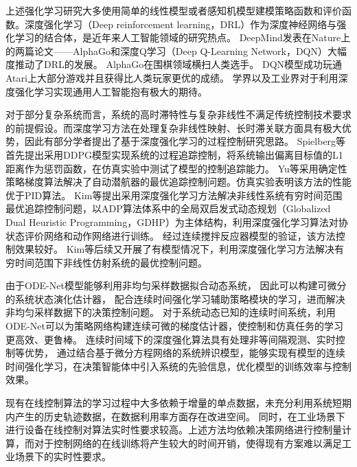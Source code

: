 上述强化学习研究大多使用简单的线性模型或者感知机模型建模策略函数和评价函数。深度强化学习（Deep reinforcement learning，DRL）作为深度神经网络与强化学习的结合体，是近年来人工智能领域的研究热点。
DeepMind发表在Nature上的两篇论文——AlphaGo\cite{silver2017mastering}和深度Q学习（Deep Q-Learning Network，DQN）\cite{mnih2015human}大幅度推动了DRL的发展。
AlphaGo在围棋领域横扫人类选手。
DQN模型成功玩通Atari上大部分游戏并且获得比人类玩家更优的成绩。
学界以及工业界对于利用深度强化学习实现通用人工智能抱有极大的期待。

对于部分复杂系统而言，系统的高时滞特性与复杂非线性不满足传统控制技术要求的前提假设。而深度学习方法在处理复杂非线性映射、长时滞关联方面具有极大优势，因此有部分学者提出了基于深度强化学习的过程控制研究思路。
Spielberg等\cite{7983780}首先提出采用DDPG模型实现系统的过程追踪控制，将系统输出偏离目标值的L1距离作为惩罚函数，在仿真实验中测试了模型的控制追踪能力。
Yu等\cite{yu2017deep}采用确定性策略梯度算法解决了自动潜航器的最优追踪控制问题。仿真实验表明该方法的性能优于PID算法。
Kim等\cite{kim2018deep}提出采用深度强化学习方法解决非线性系统有穷时间范围最优追踪控制问题，以ADP算法体系中的全局双启发式动态规划（Globalized Dual Heuristic Programming，GDHP）为主体结构，利用深度强化学习算法对协状态评价网络和动作网络进行训练。
经过连续搅拌反应器模型的验证，该方法控制效果较好。
Kim等\cite{kim2020model}后续又开展了有模型情况下，利用深度强化学习方法解决有穷时间范围下非线性仿射系统的最优控制问题。

由于ODE-Net模型能够利用非均匀采样数据拟合动态系统，
因此可以构建可微分的系统状态演化估计器，
配合连续时间强化学习辅助策略模块的学习，进而解决非均匀采样数据下的决策控制问题\cite{Yildiz2021}。
对于系统动态已知的连续时间系统，利用ODE-Net可以为策略网络构建连续可微的梯度估计器\cite{Ainsworth2020}，使控制和仿真任务的学习更高效、更鲁棒。
连续时间域下的深度强化算法具有处理非等间隔观测、实时控制等优势，
通过结合基于微分方程网络的系统辨识模型，能够实现有模型的连续时间强化学习，在决策智能体中引入系统的先验信息，优化模型的训练效率与控制效果。

现有在线控制算法的学习过程中大多依赖于增量的单点数据，未充分利用系统短期内产生的历史轨迹数据，在数据利用率方面存在改进空间。
同时，在工业场景下进行设备在线控制对算法实时性要求较高。上述方法均依赖决策网络进行控制量计算，而对于控制网络的在线训练将产生较大的时间开销，使得现有方案难以满足工业场景下的实时性要求。


